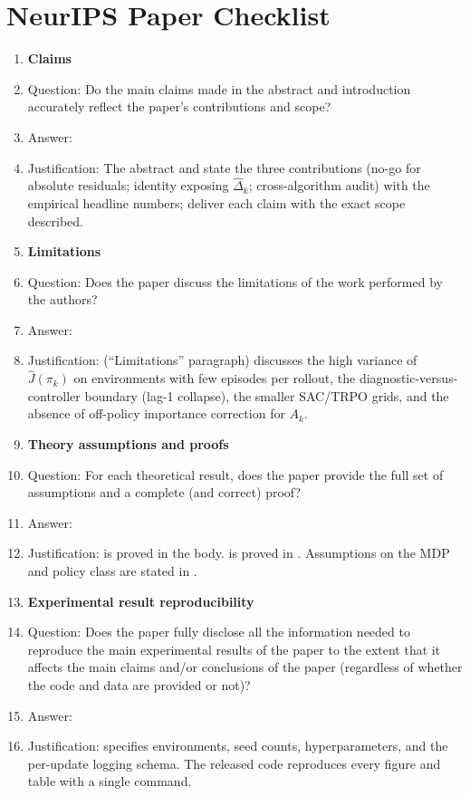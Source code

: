 \section*{NeurIPS Paper Checklist}

\begin{enumerate}

\item {\bf Claims}
    \item[] Question: Do the main claims made in the abstract and introduction accurately reflect the paper's contributions and scope?
    \item[] Answer: \answerYes{}
    \item[] Justification: The abstract and  state the three contributions (no-go for absolute residuals; identity exposing $\hat\Delta_k$; cross-algorithm audit) with the empirical headline numbers;  deliver each claim with the exact scope described.

\item {\bf Limitations}
    \item[] Question: Does the paper discuss the limitations of the work performed by the authors?
    \item[] Answer: \answerYes{}
    \item[] Justification:  (``Limitations'' paragraph) discusses the high variance of $\widehat J(\pi_k)$ on environments with few episodes per rollout, the diagnostic-versus-controller boundary (lag-1 collapse), the smaller SAC/TRPO grids, and the absence of off-policy importance correction for $A_k$.

\item {\bf Theory assumptions and proofs}
    \item[] Question: For each theoretical result, does the paper provide the full set of assumptions and a complete (and correct) proof?
    \item[] Answer: \answerYes{}
    \item[] Justification:  is proved in the body.  is proved in . Assumptions on the MDP and policy class are stated in .

    \item {\bf Experimental result reproducibility}
    \item[] Question: Does the paper fully disclose all the information needed to reproduce the main experimental results of the paper to the extent that it affects the main claims and/or conclusions of the paper (regardless of whether the code and data are provided or not)?
    \item[] Answer: \answerYes{}
    \item[] Justification:  specifies environments, seed counts, hyperparameters, and the per-update logging schema. The released code reproduces every figure and table with a single command.


\end{enumerate}
